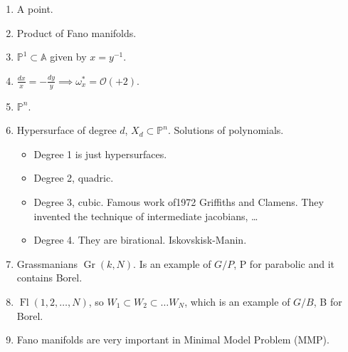 	\begin{example}\leavevmode
		\begin{enumerate}
			\item A point.
			\item Product of Fano manifolds.
			\item $\mathbb{P}^1\subset\mathbb{A}$ given by $x=y^{-1}$.
			\item $\frac{dx}{x}=-\frac{dy}{y}\implies \omega^*_x=\mathcal{O}(+2)$.
			\item $\mathbb{P}^n$.
			\item Hypersurface of degree $d$, $X_d\subset\mathbb{P}^n$. Solutions of polynomials.
			\begin{itemize}
				\item Degree 1 is just hypersurfaces.
				\item Degree 2, quadric.
				\item Degree 3, cubic. Famous work of1972 Griffiths and Clamens. They invented the technique of intermediate jacobians, …
				\item Degree 4. They are birational. Iskovskisk-Manin.
			\end{itemize}
			\item Grassmanians $\operatorname{Gr}(k,N)$. Is an example of $G/P$, P for parabolic and it contains Borel.
			\item $\operatorname{F l}(1,2,\ldots,N)$, so $W_1\subset W_2\subset\ldots W_N$, which is an example of $G/B$, B for Borel.
			\item Fano manifolds are very important in Minimal Model Problem (MMP).
		\end{enumerate}
	\end{example}
	
